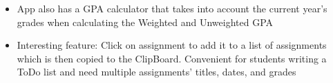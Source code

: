 \documentclass[line,margin]{res}
\begin{document}
\begin{resume}
                   \begin{itemize} \itemsep -2pt                   
                   \item App also has a GPA calculator that takes into account the current year’s grades when calculating the Weighted and Unweighted GPA
                   \end{itemize}
                   
                   \begin{itemize} \itemsep -2pt
                   \item Interesting feature: Click on assignment to add it to a list of assignments which is then copied to the ClipBoard. Convenient for students writing a ToDo list and need multiple assignments' titles, dates, and grades
                   \end{itemize}
\end{resume}
\end{document}
